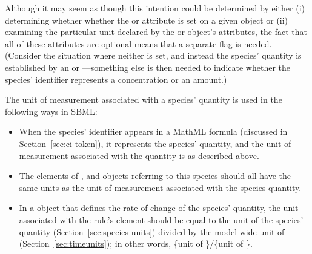 Although it may seem as though this intention could be determined
by either (i) determining whether whether the
 or  attribute is
set on a given \Species object or (ii) examining the particular
unit declared by the \Species or \Model object's
 attributes, the fact that all of these
attributes are optional means that a separate flag is needed.
(Consider the situation where neither is set, and instead the
species' quantity is established by an \InitialAssignment or
\AssignmentRule---something else is then needed to indicate
whether the species' identifier represents a concentration or an
amount.)

%

The unit of measurement associated with a species' quantity is
used in the following ways in SBML:
\begin{itemize}

\item When the species' identifier appears in a MathML formula
  (discussed in Section~\ref{sec:ci-token}), it represents the
  species' quantity, and the unit of measurement associated with
  the quantity is as described above.

\item The  elements of \AssignmentRule,
  \InitialAssignment and \EventAssignment objects referring to
  this species should all have the same units as the unit of
  measurement associated with the species quantity.

\item In a \RateRule object that defines the rate of change of the
  species' quantity, the unit associated with the rule's
   element should be equal to the unit of the species'
  quantity (Section~\ref{sec:species-units}) divided by the
  model-wide unit of 
  (Section~\ref{sec:timeunits}); in other words, \{unit of
  \}/\{unit of \}.

\end{itemize}


